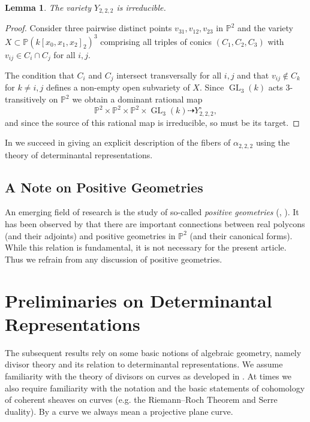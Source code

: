 \documentclass[a4paper,10pt]{amsart}
\theoremstyle{definition}
\theoremstyle{plain}
\newtheorem{lem}[defin]{Lemma}
\newcommand{\pp}{\mathbb{P}}
\begin{document}
\begin{lem}
 The variety $Y_{2,2,2}$ is irreducible.
\end{lem}

\begin{proof}
 Consider three pairwise distinct points $v_{31},v_{12},v_{23}$ in $\pp^2$ and the variety $X \subset \pp(k[x_0,x_1,x_2]_2)^3$ comprising all triples of conics $(C_1,C_2,C_3)$ with $v_{ij} \in C_i \cap C_j$ for all $i,j$.
 
 The condition that $C_i$ and $C_j$ intersect transversally for all $i,j$ and that $v_{ij} \not \in C_k$ for $k \neq i,j$ defines a non-empty open subvariety of $X$. Since $\operatorname{GL}_3(k)$ acts 3-transitively on $\pp^2$ we obtain a dominant rational map
 \begin{equation*}
     \pp^2 \times \pp^2 \times \pp^2 \times \operatorname{GL}_3(k) \dashrightarrow Y_{2,2,2}^\circ,
 \end{equation*}
 and since the source of this rational map is irreducible, so must be its target.
\end{proof}

In  we succeed in giving an explicit description of the fibers of $\alpha_{2,2,2}$ using the theory of determinantal representations.


\subsection{A Note on Positive Geometries} \label{sec:posGeom}

An emerging field of research is the study of so-called \emph{positive geometries} (\cite{arkani2017PosGeom}, \cite{Lam2022PosGeom}). It has been observed by \cite[\S2]{KohnEtAl2024AdjCurves} that there are important connections between real polycons (and their adjoints) and positive geometries in $\pp^2$ (and their canonical forms). While this relation is fundamental, it is not necessary for the present article. Thus we refrain from any discussion of positive geometries.



\section{Preliminaries on Determinantal Representations} \label{sec:PrelimAG}

The subsequent results rely on some basic notions of algebraic geometry, namely divisor theory and its relation to determinantal representations. We assume familiarity with the theory of divisors on curves as developed in \cite[\S II.6]{Hartshorne1977AG}. At times we also require familiarity with the notation and the basic statements of cohomology of coherent sheaves on curves (e.g. the Riemann--Roch Theorem and Serre duality). By a curve we always mean a projective plane curve.
\end{document}
